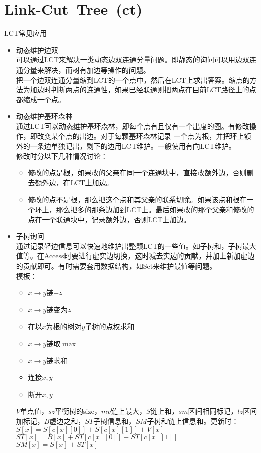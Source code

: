 \section{Link-Cut\ Tree\ \small(ct)}
	LCT常见应用
	\begin{itemize}
		\item 动态维护边双
			\\可以通过LCT来解决一类动态边双连通分量问题。即静态的询问可以用边双连通分量来解决，而树有加边等操作的问题。
			\\把一个边双连通分量缩到LCT的一个点中，然后在LCT上求出答案。缩点的方法为加边时判断两点的连通性，如果已经联通则把两点在目前LCT路径上的点都缩成一个点。
		\item 动态维护基环森林
			\\通过LCT可以动态维护基环森林，即每个点有且仅有一个出度的图。有修改操作，即改变某个点的出边。对于每颗基环森林记录
			一个点为根，并把环上额外的一条边单独记出，剩下的边用LCT维护。一般使用有向LCT维护。
			\\修改时分以下几种情况讨论：
			\begin{itemize}[nosep]
				\item 修改的点是根，如果改的父亲在同一个连通块中，直接改额外边，否则删去额外边，在LCT上加边。
				\item 修改的点不是根，那么把这个点和其父亲的联系切除。如果该点和根在一个环上，那么把多的那条边加到LCT上。最后如果改的那个父亲和修改的点在一个联通块中，记录额外边，否则LCT上加边。
			\end{itemize}
		\item 子树询问
			\\通过记录轻边信息可以快速地维护出整颗LCT的一些值。如子树和，子树最大值等。在Access时要进行虚实边切换，这时减去实边的贡献，并加上新加虚边的贡献即可。有时需要套用数据结构，如Set来维护最值等问题。
			\\模板：
			\begin{itemize}[nosep]
				\item $ x \to y $链$ + z $
				\item $ x \to y $链变为$ z $
				\item 在以$ x $为根的树对$ y $子树的点权求和
				\item $ x \to y $链取$ \max $
				\item $ x \to y $链求和
				\item 连接$ x, y $
				\item 断开$ x, y $
			\end{itemize}
			$ V $单点值，$ sz $平衡树的size，$ mv $链上最大，$ S $链上和，$ sm $区间相同标记，$ lz $区间加标记，$ B $虚边之和，$ ST $子树信息和，$ SM $子树和链上信息和。更新时：
			\\$ S[x] = S[c[x][0]] + S[c[x][1]] + V[x] $
			\\$ ST[x] =B[x] + ST[c[x][0]] + ST[c[x][1]] $
			\\$ SM[x] = S[x] + ST[x] $
	\end{itemize}
	\inputminted{cpp}{graph_theory/link_cut_tree.cpp}
